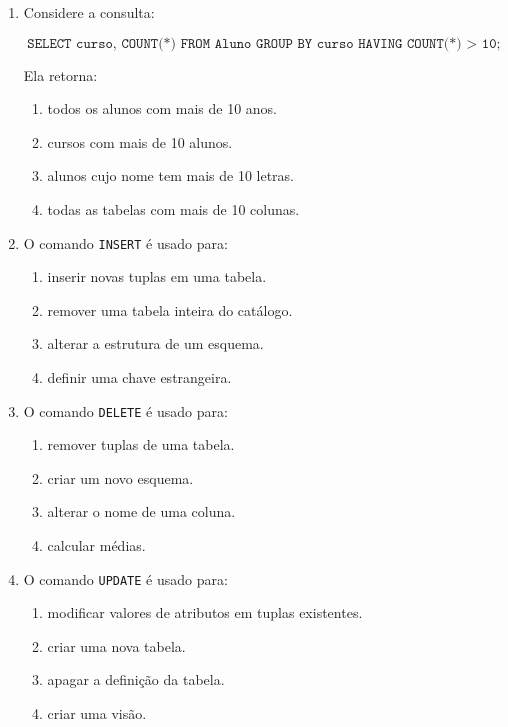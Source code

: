 \documentclass[12pt,a4paper]{article}
\begin{document}
\begin{enumerate}[label=\textbf{Q\arabic*.}]
\item Considere a consulta:

\[
\texttt{SELECT curso, COUNT(*) FROM Aluno GROUP BY curso HAVING COUNT(*) > 10;}
\]

Ela retorna:

\begin{enumerate}[label=\alph*)]
    \item todos os alunos com mais de 10 anos.
    \item cursos com mais de 10 alunos.
    \item alunos cujo nome tem mais de 10 letras.
    \item todas as tabelas com mais de 10 colunas.
\end{enumerate}

\item O comando \texttt{INSERT} é usado para:

\begin{enumerate}[label=\alph*)]
    \item inserir novas tuplas em uma tabela.
    \item remover uma tabela inteira do catálogo.
    \item alterar a estrutura de um esquema.
    \item definir uma chave estrangeira.
\end{enumerate}

\item O comando \texttt{DELETE} é usado para:

\begin{enumerate}[label=\alph*)]
    \item remover tuplas de uma tabela.
    \item criar um novo esquema.
    \item alterar o nome de uma coluna.
    \item calcular médias.
\end{enumerate}

\item O comando \texttt{UPDATE} é usado para:

\begin{enumerate}[label=\alph*)]
    \item modificar valores de atributos em tuplas existentes.
    \item criar uma nova tabela.
    \item apagar a definição da tabela.
    \item criar uma visão.
\end{enumerate}


\end{enumerate}
\end{document}
